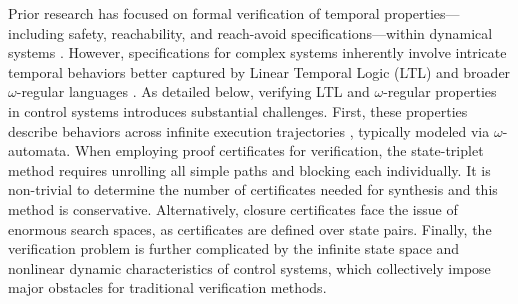 \documentclass[acmlarge]{acmart}
\begin{document}

Prior research has focused on formal verification of temporal properties---including safety, reachability, and reach-avoid specifications---within dynamical systems \cite{xue2021reach, vzikelic2023learning, ansaripour2023learning, vzikelic2023compositional, neustroev2025neural}. However, specifications for complex systems inherently involve intricate temporal behaviors better captured by Linear Temporal Logic (LTL) \cite{pnueli1977temporal} and broader $\omega$-regular languages \cite{thomas1990automata}. As detailed below, verifying LTL and $\omega$-regular properties in control systems introduces substantial challenges. First, these properties describe behaviors across infinite execution trajectories \cite{baier2008principles}, typically modeled via $\omega$-automata. When employing proof certificates for verification, the state-triplet method requires unrolling all simple paths and blocking each individually. It is non-trivial to determine the number of certificates needed for synthesis and this method is conservative. Alternatively, closure certificates face the issue of enormous search spaces, as certificates are defined over state pairs. Finally, the verification problem is further complicated by the infinite state space and nonlinear dynamic characteristics of control systems, which collectively impose major obstacles for traditional verification methods.
 
\end{document}
